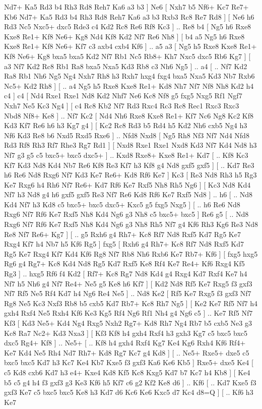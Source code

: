  Nd7+ Ka5  Rd3 b4  Rh3 Rd8  Reh7 Ka6  a3 b3   ]  Ne6 [  Nxh7 b5  Nf6+ Kc7  Re7+ Kb6  Nd7+ Ka5  Rd3 b4  Rh3 Rd8  Reh7 Ka6  a3 b3  Rxb3 Rc8  Re7 Rd8   ]  [  Ne6 h6  Rd3 Nc5  Nxc5+ dxc5  Rde3 c4  Kd2 Rc8  Re6 Rf8  Kc3   ] .. Re8    b4 [  Ng5 h6  Rxe8 Kxe8  Re1+ Kf8  Ne6+ Kg8  Nd4 Kf8  Kd2 Nf7  Re6 Nh8   ]  [  b4 a5  Ng5 h6  Rxe8 Kxe8  Re1+ Kf8  Ne6+ Kf7  c3 axb4  cxb4 Kf6   ] .. a5    a3 [  Ng5 h5  Rxe8 Kxe8  Re1+ Kf8  Ne6+ Kg8  bxa5 bxa5  Kd2 Nf7  Rb1 Nc5  Rb8+ Kh7  Nxc5 dxc5  Rb6 Kg7   ]  [  a3 Nf7  Kd2 Rc8  Rb1 Ra8  bxa5 Nxa5  Kd3 Rb8  c3 Nh6  Ng5   ] .. a4 [ .. Nf7  Kd2 Ra8  Rb1 Nh6  Ng5 Ng4  Nxh7 Rh8  h3 Rxh7  hxg4 fxg4  bxa5 Nxa5  Kd3 Nb7  Rxb6 Nc5+  Kd2 Rh8   ]  [ .. a4  Ng5 h5  Rxe8 Kxe8  Re1+ Kd8  Nh7 Nf7  Nf8 Nh8  Kd2 h4  c4   ]  c4 [  Nd4 Rxe1  Rxe1 Nd8  Kd2 Nhf7  Ne6 Kc8  Nf8 g5  fxg5 Nxg5  Rf1 Ngf7  Nxh7 Ne5  Kc3 Ng4   ]  [  c4 Rc8  Kb2 Nf7  Rd3 Rxc4  Rc3 Rc8  Rec1 Rxc3  Rxc3 Nbd8  Nf8+ Ke8   ] .. Nf7    Kc2 [  Nd4 Nh6  Rxe8 Kxe8  Re1+ Kf7  Nc6 Ng8  Kc2 Kf8  Kd3 Kf7  Re6 h6  h3 Kg7  g4   ]  [  Kc2 Rc8  Rd3 b5  Rd4 h5  Kd2 Nh6  cxb5 Ng4  h3 Nf6  Kd3 Re8  b6 Nxd5  Rxd5 Rxe6   ] .. Nfd8    Nxd8 [  Ng5 Rh8  Nf3 Nf7  Nd4 Nfd8  Rd3 Rf8  Rh3 Rf7  Rhe3 Rg7  Rd1   ]  [  Nxd8 Rxe1  Rxe1 Nxd8  Kd3 Nf7  Kd4 Nd8  h3 Nf7  g3 g5  c5 bxc5+  bxc5 dxc5+   ] .. Kxd8    Rxe8+   Kxe8    Re1+   Kd7 [ .. Kf8  Kc3 Kf7  Kd3 Nd8  Kd4 Nb7  Re6 Kf8  Re3 Kf7  h3 Kf8  g4 Nd8  gxf5 gxf5   ]  [ .. Kd7  Re3 h6  Re6 Nd8  Rxg6 Nf7  Kd3 Ke7  Re6+ Kd8  Rf6 Ke7   ]  Kc3 [  Re3 Nd8  Rh3 h5  Rg3 Ke7  Rxg6 h4  Rh6 Nf7  Re6+ Kd7  Rf6 Ke7  Rxf5 Nh8  Rh5 Ng6   ]  [  Kc3 Nd8  Kd4 Nf7  h3 Nd8  g4 h6  gxf5 gxf5  Re3 Nf7  Re6 Kd8  Rf6 Ke7  Rxf5 Nd8   ] .. h6 [ .. Nd8  Kd4 Nf7  h3 Kd8  c5 bxc5+  bxc5 dxc5+  Kxc5 g5  fxg5 Nxg5   ]  [ .. h6  Re6 Nd8  Rxg6 Nf7  Rf6 Ke7  Rxf5 Nh8  Kd4 Ng6  g3 Nh8  c5 bxc5+  bxc5   ]  Re6   g5 [ .. Nd8  Rxg6 Nf7  Rf6 Ke7  Rxf5 Nh8  Kd4 Ng6  g3 Nh8  Rh5 Nf7  g4 Kf6  Rh3 Kg6  Re3 Nd8  Re8 Nf7  Re6+ Kg7   ]  [ .. g5  Rxh6 g4  Rh7+ Kc8  Rf7 Nd8  Rxf5 Kd7  Rg5 Ke7  Rxg4 Kf7  h4 Nb7  h5 Kf6  Rg5   ]  fxg5 [  Rxh6 g4  Rh7+ Kc8  Rf7 Nd8  Rxf5 Kd7  Rg5 Ke7  Rxg4 Kf7  Kd4 Kf6  Rg8 Nf7  Rb8 Nh6  Rxb6 Ke7  Rb7+ Kf6   ]  [  fxg5 hxg5  Rg6 g4  Rg7+ Kc8  Kd4 Nd8  Rg5 Kd7  Rxf5 Ke8  Rf4 Ke7  Re4+ Kf6  Rxg4 Kf5  Rg3   ] .. hxg5    Rf6   f4    Kd2 [  Rf7+ Kc8  Rg7 Nd8  Kd4 g4  Rxg4 Kd7  Rxf4 Ke7  h4 Nf7  h5 Nh6  g4 Nf7  Re4+ Ne5  g5 Ke8  h6 Kf7   ]  [  Kd2 Nd8  Rf5 Ke7  Rxg5 f3  gxf3 Nf7  Rf5 Ne5  Rf4 Kd7  h4 Ng6  Re4 Ne5   ] .. Nd8    Ke2 [  Rf5 Ke7  Rxg5 f3  gxf3 Nf7  Rg8 Ne5  Kc3 Nxf3  Rb8 b5  cxb5 Kd7  Rb7+ Kc8  Rh7 Ng5   ]  [  Ke2 Ke7  Rf5 Nf7  h4 gxh4  Rxf4 Ne5  Rxh4 Kf6  Ke3 Kg5  Rf4 Ng6  Rf1 Nh4  g4 Ng6  c5   ] .. Ke7    Rf5   Nf7    Kf3 [  Kd3 Ne5+  Kd4 Ng4  Rxg5 Nxh2  Rg7+ Kd8  Rh7 Ng4  Rb7 b5  cxb5 Ne3  g3 Kc8  Ra7 Nc2+  Kd3 Nxa3   ]  [  Kf3 Kf8  h4 gxh4  Rxf4 h3  gxh3 Kg7  c5 bxc5  bxc5 dxc5  Rg4+ Kf8   ] .. Ne5+ [ .. Kf8  h4 gxh4  Rxf4 Kg7  Ke4 Kg6  Rxh4 Kf6  Rf4+ Ke7  Kd4 Ne5  Rh4 Nd7  Rh7+ Kd8  Rg7 Kc7  g4 Kd8   ]  [ .. Ne5+  Rxe5+ dxe5  c5 bxc5  bxc5 Kd7  h3 Kc7  Ke4 Kb7  Kxe5 f3  gxf3 Ka6  Ke6 Kb5   ]  Rxe5+   dxe5    Ke4 [  c5 Kd8  cxb6 Kd7  h3 e4+  Kxe4 Kd8  Kf5 Kc8  Kxg5 Kd7  b7 Kc7  h4 Kb8   ]  [  Ke4 b5  c5 g4  h4 f3  gxf3 g3  Ke3 Kf6  h5 Kf7  c6 g2  Kf2 Ke8  d6   ] .. Kf6 [ .. Kd7  Kxe5 f3  gxf3 Ke7  c5 bxc5  bxc5 Ke8  h3 Kd7  d6 Kc6  Ke6 Kxc5  d7 Kc4  d8=Q   ]  [ .. Kf6  h3 Ke7  